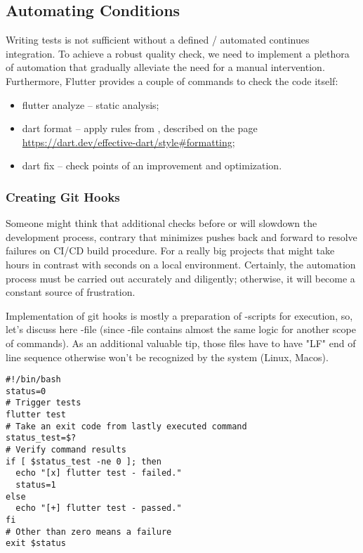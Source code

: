 
\newpage
\subsection{Automating Conditions}

Writing tests is not sufficient without a defined / automated continues integration. To achieve a robust quality check,
we need to implement a plethora of automation that gradually alleviate the need for a manual intervention. Furthermore,
Flutter provides a couple of commands to check the code itself:

\begin{itemize}
  \item flutter analyze -- static analysis;
  \item dart format -- apply rules from , described on the page
  \href{https://dart.dev/effective-dart/style\#formatting}{https://dart.dev/effective-dart/style\#formatting};
  \item dart fix -- check points of an improvement and optimization.
\end{itemize}


\subsubsection{Creating Git Hooks}

Someone might think that additional checks before  or  will slowdown the development process,
contrary that minimizes pushes back and forward to resolve failures on CI/CD build procedure. For a really big projects
that might take hours in contrast with seconds on a local environment. Certainly, the automation process must be
carried out accurately and diligently; otherwise, it will become a constant source of frustration.

Implementation of git hooks is mostly a preparation of -scripts for execution, so, let's discuss here
-file (since -file contains almost the same logic for another scope of commands). As an
additional valuable tip, those files have to have "LF" end of line sequence otherwise won't be recognized by the system
(Linux, Macos).

\begin{lstlisting}[language=terminal]
#!/bin/bash
status=0
# Trigger tests
flutter test
# Take an exit code from lastly executed command
status_test=$?
# Verify command results
if [ $status_test -ne 0 ]; then
  echo "[x] flutter test - failed."
  status=1
else
  echo "[+] flutter test - passed."
fi
# Other than zero means a failure
exit $status
\end{lstlisting}

